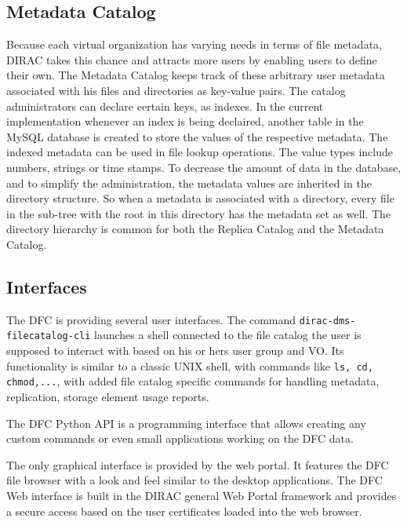 \subsection{Metadata Catalog}

Because each virtual organization has varying needs in terms of file metadata, DIRAC takes this chance and 
attracts more users by enabling users to define their own. The Metadata Catalog keeps track of these 
arbitrary user metadata associated with his files and directories as key-value pairs. 
The catalog administrators can declare certain keys, as indexes. In the current implementation whenever an 
index is being declaired, another table in the MySQL database is created to store the values of the 
respective metadata. The indexed metadata can be used in file lookup operations. The value types include 
numbers, strings or time stamps. To decrease the amount of data in the database, and to simplify the 
administration, the metadata values are inherited in the directory structure. So when a metadata is 
associated with a directory, every file in the sub-tree with the root in this directory has the metadata
set as well. The directory hierarchy is common for both the Replica Catalog and the Metadata Catalog.

\subsection{Interfaces}

The DFC is providing several user interfaces. The command \texttt{dirac-dms-filecatalog-cli} launches a shell
connected to the file catalog the user is supposed to interact with based on his or hers user group and VO. Its 
functionality is similar to a classic UNIX shell, with commands like \texttt{ls, cd, chmod,...}, with added 
file catalog specific commands for handling metadata, replication, storage element usage reports.

The DFC Python API is a programming interface that allows creating any custom commands or even
small applications working on the DFC data.

The only graphical interface is provided by the web portal. It features the DFC file browser
with a look and feel similar to the desktop applications. The DFC Web interface is built in the DIRAC 
general Web Portal framework and provides a secure access based on the user certificates loaded into 
the web browser.